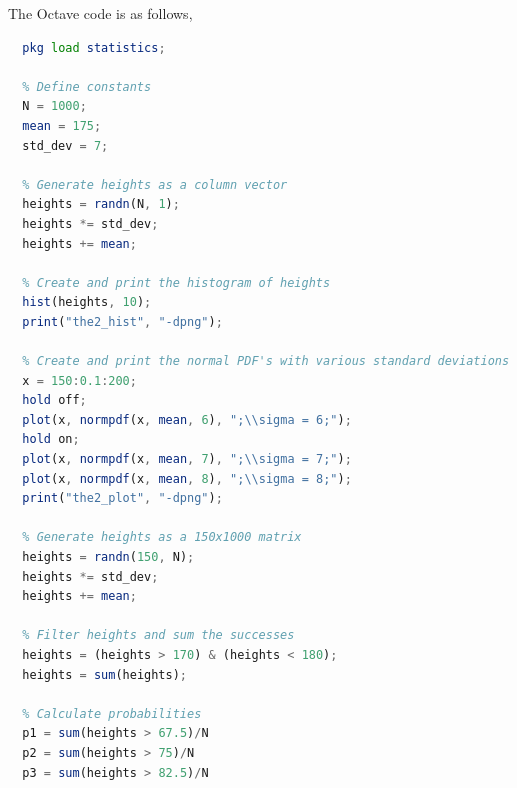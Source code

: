 \documentclass[12pt]{article}
\begin{document}
\noindent
The Octave code is as follows,
\begin{lstlisting}[language=Octave]
  % Load statistics module for normal probability density function
  pkg load statistics;

  % Define constants
  N = 1000;
  mean = 175;
  std_dev = 7;

  % Generate heights as a column vector
  heights = randn(N, 1);
  heights *= std_dev;
  heights += mean;

  % Create and print the histogram of heights
  hist(heights, 10);
  print("the2_hist", "-dpng");

  % Create and print the normal PDF's with various standard deviations
  x = 150:0.1:200;
  hold off;
  plot(x, normpdf(x, mean, 6), ";\\sigma = 6;");
  hold on;
  plot(x, normpdf(x, mean, 7), ";\\sigma = 7;");
  plot(x, normpdf(x, mean, 8), ";\\sigma = 8;");
  print("the2_plot", "-dpng");

  % Generate heights as a 150x1000 matrix
  heights = randn(150, N);
  heights *= std_dev;
  heights += mean;

  % Filter heights and sum the successes
  heights = (heights > 170) & (heights < 180);
  heights = sum(heights);

  % Calculate probabilities
  p1 = sum(heights > 67.5)/N
  p2 = sum(heights > 75)/N
  p3 = sum(heights > 82.5)/N
\end{lstlisting}
\end{document}
